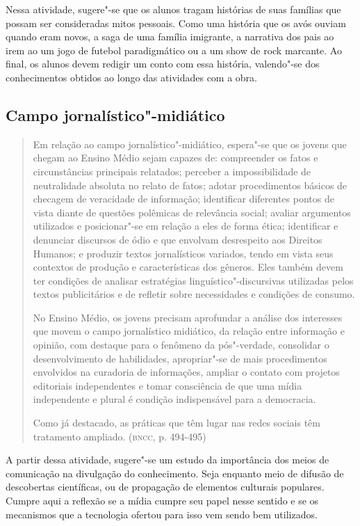 \documentclass[12pt]{extarticle}
\begin{document}
  Nessa atividade, sugere"-se que os alunos tragam histórias de suas
  famílias que possam ser consideradas mitos pessoais. Como uma história
  que os avós ouviam quando eram novos, a saga de uma família imigrante,
  a narrativa dos pais ao irem ao um jogo de futebol paradigmático ou a
  um show de rock marcante. Ao final, os alunos devem redigir um conto
  com essa história, valendo"-se dos conhecimentos obtidos ao longo das
  atividades com a obra.

\subsection{Campo jornalístico"-midiático}

\begin{quote}
Em relação ao campo jornalístico"-midiático, espera"-se que os jovens
que chegam ao Ensino Médio sejam capazes de: compreender os fatos e
circunstâncias principais relatados; perceber a impossibilidade de
neutralidade absoluta no relato de fatos; adotar procedimentos básicos
de checagem de veracidade de informação; identificar diferentes pontos
de vista diante de questões polêmicas de relevância social; avaliar
argumentos utilizados e posicionar"-se em relação a eles de forma ética;
identificar e denunciar discursos de ódio e que envolvam desrespeito aos
Direitos Humanos; e produzir textos jornalísticos variados, tendo em
vista seus contextos de produção e características dos gêneros. Eles
também devem ter condições de analisar estratégias
linguístico"-discursivas utilizadas pelos textos publicitários e de
refletir sobre necessidades e condições de consumo.

No Ensino Médio, os jovens precisam aprofundar a análise dos interesses
que movem o campo jornalístico midiático, da relação entre informação e
opinião, com destaque para o fenômeno da pós"-verdade, consolidar o
desenvolvimento de habilidades, apropriar"-se de mais procedimentos
envolvidos na curadoria de informações, ampliar o contato com projetos
editoriais independentes e tomar consciência de que uma mídia
independente e plural é condição indispensável para a democracia.

Como já destacado, as práticas que têm lugar nas redes sociais têm
tratamento ampliado. (\textsc{bncc}, p. 494-495)
\end{quote}

  A partir dessa atividade, sugere"-se um estudo da importância dos meios
  de comunicação na divulgação do conhecimento. Seja enquanto meio de
  difusão de descobertas científicas, ou de propagação de elementos
  culturais populares. Cumpre aqui a reflexão se a mídia cumpre seu
  papel nesse sentido e se os mecanismos que a tecnologia ofertou para
  isso vem sendo bem utilizados.
\end{document}
